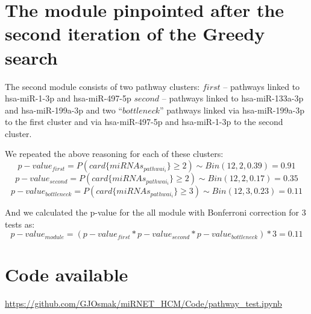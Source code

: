 \documentclass[a4paper, 12pt]{article}
\begin{document}
\section{The module pinpointed after the second \mbox{iteration} of the Greedy search}

	The second module consists of two pathway clusters: 
	$first$ – pathways linked to hsa-miR-1-3p and hsa-miR-497-5p 
	$second$ – pathways linked to hsa-miR-133a-3p and hsa-miR-199a-3p 
	and two “$bottleneck$” pathways linked via hsa-miR-199a-3p to the first cluster and via hsa-miR-497-5p and hsa-miR-1-3p to the second cluster.
	
	We repeated the above reasoning for each of these clusters:
	\[p-value_{first} = P(card\{miRNAs_{pathwai_i}\} \geq 2) \sim Bin(12, 2, 0.39)=0.91\]
	\[p-value_{second} = P(card\{miRNAs_{pathwai_i}\} \geq 2) \sim Bin(12, 2, 0.17)=0.35\]
	\[p-value_{bottleneck}= P(card\{miRNAs_{pathwai_i}\} \geq 3) \sim Bin(12, 3, 0.23)=0.11\]

	And we calculated the p-value for the all module with Bonferroni correction for 3 tests as:
	\[p-value_{module}= (p-value_{first} * p-value_{second} * p-value_{bottleneck})*3=0.11\]

\section{Code available}

\url{https://github.com/GJOsmak/miRNET_HCM/Code/pathway_test.ipynb}
\end{document}
